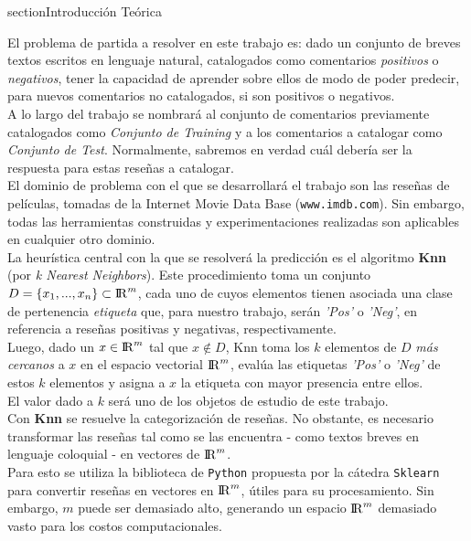section{Introducción Teórica} \label{introTeorica}


El problema de partida a resolver en este trabajo es: dado un conjunto de breves textos escritos en lenguaje natural, catalogados como comentarios \textit{positivos} o \textit{negativos}, tener la capacidad de aprender sobre ellos de modo de poder predecir, para nuevos comentarios no catalogados, si son positivos o negativos.\\
A lo largo del trabajo se nombrará al conjunto de comentarios previamente catalogados como \textit{Conjunto de Training} y a los comentarios a catalogar como \textit{Conjunto de Test}. Normalmente, sabremos en verdad cuál debería ser la respuesta para estas reseñas a catalogar. \\

El dominio de problema con el que se desarrollará el trabajo son las reseñas de películas, tomadas de la Internet Movie Data Base (\texttt{www.imdb.com}). Sin embargo, todas las herramientas construidas y experimentaciones realizadas son aplicables en cualquier otro dominio.\\

La heurística central con la que se resolverá la predicción es el algoritmo \textbf{Knn} (por \textit{k Nearest Neighbors}). Este procedimiento toma  un conjunto $D = \{x_{1},...,x_{n}\} \subset {\rm I\!R}^{m}$, cada uno de cuyos elementos tienen asociada una clase de pertenencia \textit{etiqueta} que, para nuestro trabajo, serán \textit{'Pos'} o \textit{'Neg'}, en referencia a reseñas positivas y negativas, respectivamente.\\

Luego, dado un $x \in {\rm I\!R}^{m}$ tal que $x \notin D$, Knn toma los $k$ elementos de $D$ \textit{más cercanos} a $x$ en el espacio vectorial ${\rm I\!R}^{m}$, evalúa las etiquetas \textit{'Pos'} o \textit{'Neg'} de estos $k$ elementos y asigna a $x$ la etiqueta con mayor presencia entre ellos.\\
El valor dado a $k$ será uno de los objetos de estudio de este trabajo.\\


Con \textbf{Knn} se resuelve la categorización de reseñas. No obstante, es necesario transformar las reseñas tal como se las encuentra - como textos breves en lenguaje coloquial - en vectores de ${\rm I\!R}^{m}$. \\


Para esto se utiliza la biblioteca de \texttt{Python} propuesta por la cátedra \texttt{Sklearn} para convertir reseñas en vectores en ${\rm I\!R}^{m}$, útiles para su procesamiento.  
Sin embargo, $m$ puede ser demasiado alto, generando un espacio ${\rm I\!R}^{m}$ demasiado vasto para los costos computacionales. \\


